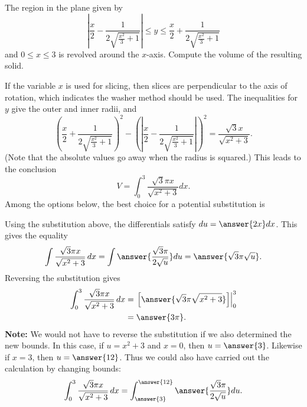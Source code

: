 \documentclass{ximera}
\begin{document}
\begin{example}%
The region in the plane given by \[\left|{\frac{x}{2} - \frac{1}{2 \sqrt{\frac{x^{2}}{3} + 1}}}\right| \leq y \leq \frac{x}{2} + \frac{1}{2 \sqrt{\frac{x^{2}}{3} + 1}}\] and \(0 \leq x \leq 3\) is revolved around the \(x\)-axis. Compute the volume of the resulting solid.

If the variable \(x\) is used for slicing, then slices are perpendicular to the axis of rotation, which indicates the washer method should be used.
The inequalities for \(y\) give the outer and inner radii, and \[ \left(\frac{x}{2} + \frac{1}{2 \sqrt{\frac{x^{2}}{3} + 1}}\right)^2 - \left( \left|{\frac{x}{2} - \frac{1}{2 \sqrt{\frac{x^{2}}{3} + 1}}}\right|\right)^2 = \frac{\sqrt{3} x}{\sqrt{x^{2} + 3}}. \] (Note that the absolute values go away when the radius is squared.)
This leads to the conclusion
\[ V=  \int_{0}^{3} \frac{\sqrt{3} \pi x}{\sqrt{x^{2} + 3}} dx. \]
Among the options below, the best choice for a potential substitution is
\begin{multipleChoice}
\end{multipleChoice}
Using the substitution above, the differentials satisfy \(du = \answer{2x}dx\). This gives the equality
\[  \int \frac{\sqrt{3} \pi x}{\sqrt{x^{2} + 3}}\, dx  = \int \answer{\frac{\sqrt{3} \pi}{2 \sqrt{u}}} du = \answer{\sqrt{3} \pi \sqrt{u}}.  \]
Reversing the substitution gives
\[ \begin{aligned} \int_{0}^{3} \frac{\sqrt{3} \pi x}{\sqrt{x^{2} + 3}}\, dx & = \left. \left[\answer{\sqrt{3} \pi \sqrt{x^{2} + 3}} \right] \right|_{0}^{3}\\ & =  \answer{3 \pi}. \end{aligned} \]
\textbf{Note:} We would not have to reverse the substitution if we also determined the new bounds. In this case, if $u = x^2 + 3$ and $x = 0$, then $u = \answer{3}$. Likewise if $x = 3$, then $u = \answer{12}$. Thus we could also have carried out the calculation by changing bounds:
\[ \int_{0}^{3} \frac{\sqrt{3} \pi x}{\sqrt{x^{2} + 3}}\, dx = \int_{\answer{3}}^{\answer{12}} \answer{\frac{\sqrt{3} \pi}{2 \sqrt{u}}} du. \]
\end{example}
\end{document}
